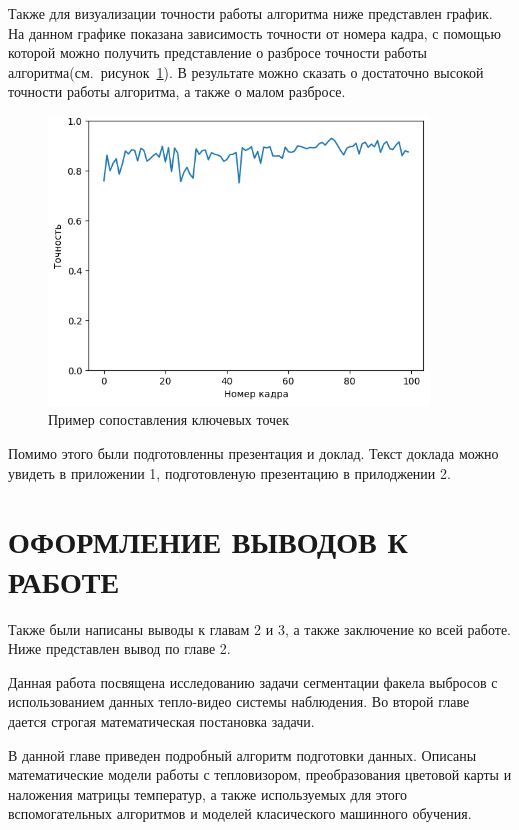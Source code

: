 \documentclass[14pt, a4paper]{extreport}
\begin{document}
	Также для визуализации точности работы алгоритма ниже представлен график. На данном графике показана зависимость точности от номера кадра, с помощью которой можно получить представление о разбросе точности работы алгоритма(см.~рисунок~\ref{fig:accuracy_itog_plot}). В результате можно сказать о достаточно высокой точности работы алгоритма, а также о малом разбросе.
	\begin{figure}[h!]
		\centering
		\includegraphics[width = 0.9\textwidth]{image/chapter_3/accuracy_itog_plot}	
		\caption{Пример сопоставления ключевых точек}
		\label{fig:accuracy_itog_plot}
	\end{figure}

	Помимо этого были подготовленны презентация и доклад. Текст доклада можно увидеть в приложении 1, подготовленую презентацию в прилоджении 2.

\chapter {ОФОРМЛЕНИЕ ВЫВОДОВ К РАБОТЕ}

	Также были написаны выводы к главам 2 и 3, а также заключение ко всей работе. Ниже представлен вывод по главе 2.
	
	Данная работа посвящена исследованию задачи сегментации факела выбросов с использованием данных тепло-видео системы наблюдения. Во второй главе дается строгая математическая постановка задачи.
	
	В данной главе приведен подробный алгоритм подготовки данных. Описаны математические модели работы с тепловизором, преобразования цветовой карты и наложения матрицы температур, а также используемых для этого вспомогательных алгоритмов и моделей класического машинного обучения.
	
\end{document}
